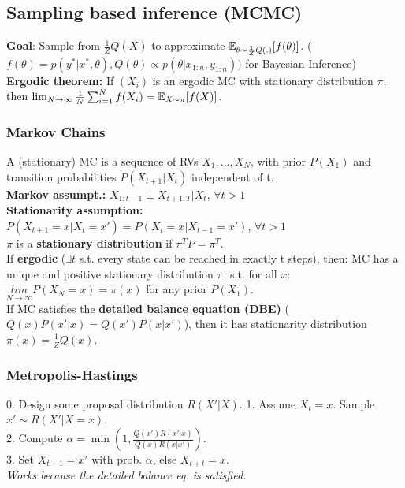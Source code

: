 \subsection{Sampling based inference (MCMC)}
\textbf{Goal}: Sample from $\frac{1}{Z}Q(X)$ to approximate
$\mathbb{E}_{\theta\sim\frac{1}{Z}Q(.)}[f(\theta)]$. ($f(\theta) = p(y^*|x^*,\theta), Q(\theta)\propto p(\theta|x_{1:n},y_{1:n}))$ for Bayesian Inference)\\
\textbf{Ergodic theorem:} If $(X_i)$ is an ergodic MC with stationary distribution $\pi$, then
$\lim_{N\to\infty}\frac{1}{N}\sum_{i=1}^{N}f(X_i) = \mathbb{E}_{X\sim\pi}[f(X)]$. 

\subsubsection{Markov Chains}
A (stationary) MC is a sequence of RVs $X_1, ..., X_N$, with prior $P(X_1)$ and transition probabilities $P(X_{t+1}|X_t)$ independent of t.\\
\textbf{Markov assumpt.:} $X_{1:t-1}\perp X_{t+1:T}|X_t$, $\forall t>1$\\
\textbf{Stationarity assumption:}\\
$P(X_{t+1}=x|X_t=x')=P(X_{t}=x|X_{t-1}=x')$, $\forall t>1$\\
$\pi$ is a \textbf{stationary distribution} if $\pi^TP = \pi^T$.\\
If \textbf{ergodic} ($\exists t$ s.t. every state can be reached in exactly t steps), then: MC has a unique and positive stationary distribution $\pi$, s.t. for all $x$:\\
            $\underset{N\rightarrow\infty}{lim}P(X_N=x)=\pi(x)$ for any prior $P(X_1)$.\\
If MC satisfies the \textbf{detailed balance equation (DBE)} ($Q(x)P(x'|x)=Q(x')P(x|x')$), then it has stationarity distribution $\pi(x)=\frac{1}{Z}Q(x)$.

\subsubsection{Metropolis-Hastings}
0. Design some proposal distribution $R(X'|X)$.
1. Assume $X_t = x$. Sample $x' \sim R(X'|X=x)$.\\
2. Compute $\alpha = \min(1, \frac{Q(x')R(x'|x)}{Q(x)R(x|x')})$.\\
3. Set $X_{t+1} = x'$ with prob. $\alpha$, else $X_{t+t} = x$.
{\tiny\CircArrowRight{}}\\
\emph{Works because the detailed balance eq. is satisfied.}
